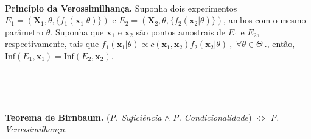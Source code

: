 \documentclass[
]{book}
\begin{document}
\(~\)

\textbf{Princípio da Verossimilhança.} Suponha dois experimentos \(E_1=(\boldsymbol X_1,\theta,\{f_1(\boldsymbol x_1|\theta)\})\) e \(E_2=(\boldsymbol X_2,\theta,\{f_2(\boldsymbol x_2|\theta)\})\), ambos com o mesmo parâmetro \(\theta\). Suponha que \(\boldsymbol x_1\) e \(\boldsymbol x_2\) são pontos amostrais de \(E_1\) e \(E_2\), respectivamente, tais que \(f_1(\boldsymbol x_1|\theta)\propto c(\boldsymbol x_1,\boldsymbol x_2)f_2(\boldsymbol x_2|\theta)~,\) \(\forall \theta\in\Theta~.\), então, \(\text{Inf}(E_1,\boldsymbol x_1)=\text{Inf}(E_2,\boldsymbol x_2)\).

\(~\)

\(~\)

\textbf{Teorema de Birnbaum.} (\emph{P. Suficiência} \(\wedge\) \emph{P. Condicionalidade}) \(\Longleftrightarrow\) \emph{P. Verossimilhança}.
\end{document}
